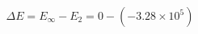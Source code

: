 \documentclass[preview]{standalone}
\begin{document}
\begin{align*}
\Delta E=E_{\infty}-E_{2}=0-(-3.28\times10^{5})
\end{align*}
\end{document}
